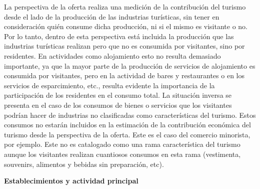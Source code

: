 \documentclass[
  openany]{book}
\begin{document}
La perspectiva de la oferta realiza una medición de la contribución del turismo desde el lado de la producción de las industrias turísticas, sin tener en consideración quién consume dicha producción, ni si el mismo es visitante o no. Por lo tanto, dentro de esta perspectiva está incluida la producción que las industrias turísticas realizan pero que no es consumida por visitantes, sino por residentes. En actividades como alojamiento esto no resulta demasiado importante, ya que la mayor parte de la producción de servicios de alojamiento es consumida por visitantes, pero en la actividad de bares y restaurantes o en los servicios de esparcimiento, etc., resulta evidente la importancia de la participación de los residentes en el consumo total. La situación inversa se presenta en el caso de los consumos de bienes o servicios que los visitantes podrían hacer de industrias no clasificadas como características del turismo. Estos consumos no estarán incluidos en la estimación de la contribución económica del turismo desde la perspectiva de la oferta. Este es el caso del comercio minorista, por ejemplo. Este no es catalogado como una rama característica del turismo aunque los visitantes realizan cuantiosos consumos en esta rama (vestimenta, souvenirs, alimentos y bebidas sin preparación, etc).

\textbf{Establecimientos y actividad principal}
\end{document}
